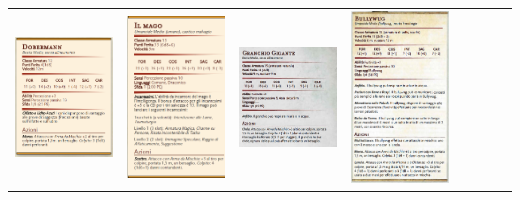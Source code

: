 \documentclass{article}
\begin{document}
\begin{table}
\begin{tabular}{|cr|cr|cr|cr|}
        \includegraphics[width=4cm, height = 6 cm]{../Mostri/Doberman.png} &  \includegraphics[width=4cm, height = 6 cm]{../Mostri/mago.png} &\includegraphics[width=4cm, height = 6 cm]{../Mostri/Granchio Gigante.PNG} &  \includegraphics[width=4cm, height = 6 cm]{../Mostri/Bullywug.PNG} \\

\end{tabular}
\end{table}
\end{document}
